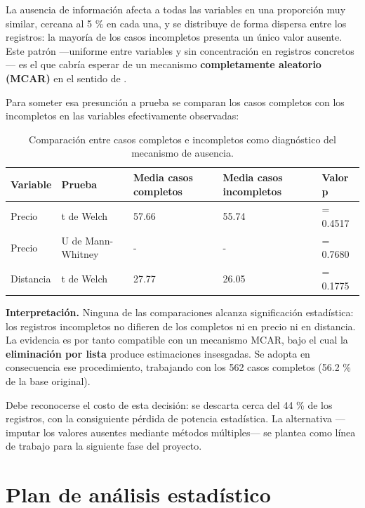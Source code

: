 \documentclass[
]{book}
\begin{document}
La ausencia de información afecta a todas las variables en una proporción muy similar,
cercana al 5 \% en cada una, y se distribuye de forma dispersa entre los registros: la mayoría
de los casos incompletos presenta un único valor ausente. Este patrón ---uniforme entre
variables y sin concentración en registros concretos--- es el que cabría esperar de un mecanismo
\textbf{completamente aleatorio (MCAR)} en el sentido de \citet{rubin1976}.

Para someter esa presunción a prueba se comparan los casos completos con los incompletos en
las variables efectivamente observadas:

\begin{table}

\caption{\label{tab:prueba-mcar}Comparación entre casos completos e incompletos como diagnóstico del mecanismo de ausencia.}
\centering
\begin{tabular}[t]{l|l|l|l|l}
\hline
Variable & Prueba & Media casos completos & Media casos incompletos & Valor p\\
\hline
Precio & t de Welch & 57.66 & 55.74 & = 0.4517\\
\hline
Precio & U de Mann-Whitney & - & - & = 0.7680\\
\hline
Distancia & t de Welch & 27.77 & 26.05 & = 0.1775\\
\hline
\end{tabular}
\end{table}

\textbf{Interpretación.} Ninguna de las comparaciones alcanza significación estadística: los
registros incompletos no difieren de los completos ni en precio ni en distancia. La evidencia
es por tanto compatible con un mecanismo MCAR, bajo el cual la \textbf{eliminación por lista}
produce estimaciones insesgadas. Se adopta en consecuencia ese procedimiento, trabajando con
los 562 casos completos (56.2 \% de la base original).

Debe reconocerse el costo de esta decisión: se descarta cerca del
44 \% de los registros, con la consiguiente pérdida de
potencia estadística. La alternativa ---imputar los valores ausentes mediante métodos múltiples---
se plantea como línea de trabajo para la siguiente fase del proyecto.

\section{Plan de análisis estadístico}\label{plan-de-anuxe1lisis-estaduxedstico}
\end{document}
